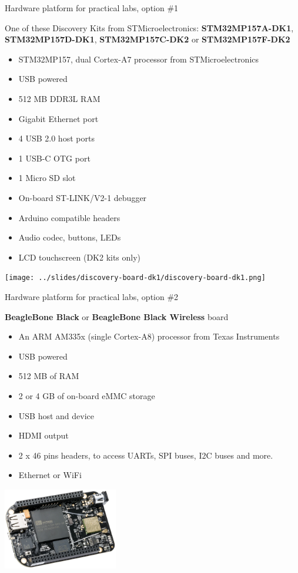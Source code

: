 \documentclass[a4paper,12pt,obeyspaces,spaces,hyphens]{article}
\begin{document}
\feagendatwocolumn
{Hardware platform for practical labs, option \#1}
{
  One of these Discovery Kits from STMicroelectronics: {\bf
  STM32MP157A-DK1}, {\bf STM32MP157D-DK1}, {\bf STM32MP157C-DK2} or
  {\bf STM32MP157F-DK2}
  \begin{itemize}
  \item STM32MP157, dual Cortex-A7 processor from STMicroelectronics
  \item USB powered
  \item 512 MB DDR3L RAM
  \item Gigabit Ethernet port
  \item 4 USB 2.0 host ports
  \item 1 USB-C OTG port
  \item 1 Micro SD slot
  \item On-board ST-LINK/V2-1 debugger
  \item Arduino compatible headers
  \item Audio codec, buttons, LEDs
  \item LCD touchscreen (DK2 kits only)
  \end{itemize}
}
{}
{
  \begin{center}
    \texttt{[image: ../slides/discovery-board-dk1/discovery-board-dk1.png]}
  \end{center}
}

\feagendatwocolumn
{Hardware platform for practical labs, option \#2}
{
  {\bf BeagleBone Black} or {\bf BeagleBone Black Wireless} board
  \begin{itemize}
  \item An ARM AM335x (single Cortex-A8) processor from Texas
    Instruments
  \item USB powered
  \item 512 MB of RAM
  \item 2 or 4 GB of on-board eMMC storage
  \item USB host and device
  \item HDMI output
  \item 2 x 46 pins headers, to access UARTs, SPI buses, I2C buses
    and more.
  \item Ethernet or WiFi
  \end{itemize}
}
{}
{
  \begin{center}
    \includegraphics[width=5cm]{../slides/beagleboneblack-board/beagleboneblack.png}
  \end{center}
}
\end{document}
